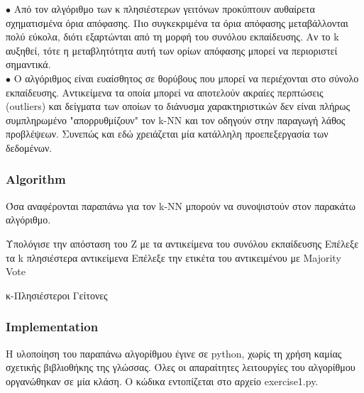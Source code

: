 \documentclass[12pt]{article}
\begin{document}
\(\bullet\) Από τον αλγόριθμο των κ πλησιέστερων γειτόνων προκύπτουν αυθαίρετα σχηματισμένα όρια απόφασης. Πιο συγκεκριμένα τα όρια απόφασης μεταβάλλονται πολύ εύκολα, διότι εξαρτώνται από τη μορφή του συνόλου εκπαίδευσης. Αν το k αυξηθεί, τότε η μεταβλητότητα αυτή των ορίων απόφασης μπορεί να περιοριστεί σημαντικά. \\

\(\bullet\) Ο αλγόριθμος είναι ευαίσθητος σε θορύβους που μπορεί να περιέχονται στο σύνολο εκπαίδευσης. Αντικείμενα τα οποία μπορεί να αποτελούν ακραίες περπτώσεις (outliers) και δείγματα των οποίων το διάνυσμα χαρακτηριστικών δεν είναι πλήρως συμπληρωμένο "απορρυθμίζουν" τον k-NN και τον οδηγούν στην παραγωγή λάθος προβλέψεων. Συνεπώς και εδώ χρειάζεται μία κατάλληλη προεπεξεργασία των δεδομένων. \\ 


\subsubsection*{Algorithm}

Όσα αναφέρονται παραπάνω για τον k-NN μπορούν να συνοψιστούν στον παρακάτω αλγόριθμο. \\

\begin{algorithm}[H]
	\SetAlgoLined
	
	{Υπολόγισε την απόσταση του Z με τα αντικείμενα του συνόλου εκπαίδευσης \;
	 Επέλεξε τα k πλησιέστερα αντικείμενα \;
 	Επέλεξε την ετικέτα του αντικειμένου με Majority Vote \;}		
	
	\caption{κ-Πλησιέστεροι Γείτονες}
\end{algorithm}

\subsubsection*{Implementation}

Η υλοποίηση του παραπάνω αλγορίθμου έγινε σε python, χωρίς τη χρήση καμίας σχετικής βιβλιοθήκης της γλώσσας. Όλες οι απαραίτητες λειτουργίες του αλγορίθμου οργανώθηκαν σε μία κλάση. Ο κώδικα εντοπίζεται στο αρχείο exercise1.py. \\ 
\end{document}
